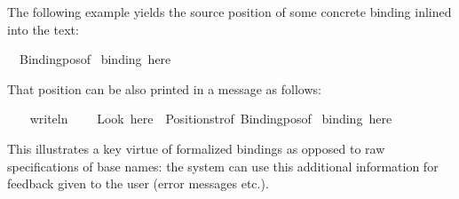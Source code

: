 \begin{isabellebody}
\begin{isamarkuptext}
\begin{description}
  \end{description}%
\end{isamarkuptext}%
\isamarkuptrue%
%
\endisatagmlantiq
{\isafoldmlantiq}%
%
\isadelimmlantiq
%
\endisadelimmlantiq
%
\isadelimmlex
%
\endisadelimmlex
%
\isatagmlex
%
\begin{isamarkuptext}%
The following example yields the source position of some
  concrete binding inlined into the text:%
\end{isamarkuptext}%
\isamarkuptrue%
%
\endisatagmlex
{\isafoldmlex}%
%
\isadelimmlex
%
\endisadelimmlex
%
\isadelimML
%
\endisadelimML
%
\isatagML
{}\isamarkupfalse%
\ {\isacharverbatimopen}\ Binding{\isachardot}pos{\isacharunderscore}of\ %
\isaantiq
binding\ here%
\endisaantiq
\ {\isacharverbatimclose}%
\endisatagML
{\isafoldML}%
%
\isadelimML
%
\endisadelimML
%
\begin{isamarkuptext}%
\medskip That position can be also printed in a message as
  follows:%
\end{isamarkuptext}%
\isamarkuptrue%
%
\isadelimML
%
\endisadelimML
%
\isatagML
{}\isamarkupfalse%
\ {\isacharverbatimopen}\isanewline
\ \ writeln\isanewline
\ \ \ \ {\isacharparenleft}{\isachardoublequote}Look\ here{\isachardoublequote}\ {\isacharcircum}\ Position{\isachardot}str{\isacharunderscore}of\ {\isacharparenleft}Binding{\isachardot}pos{\isacharunderscore}of\ %
\isaantiq
binding\ here%
\endisaantiq
{\isacharparenright}{\isacharparenright}\isanewline
{\isacharverbatimclose}%
\endisatagML
{\isafoldML}%
%
\isadelimML
%
\endisadelimML
%
\begin{isamarkuptext}%
This illustrates a key virtue of formalized bindings as
  opposed to raw specifications of base names: the system can use this
  additional information for feedback given to the user (error
  messages etc.).%
\end{isamarkuptext}%
\isamarkuptrue%
%
\isadelimtheory
%
\endisadelimtheory
%
\isatagtheory
{}\isamarkupfalse%
%
\endisatagtheory
{\isafoldtheory}%
%
\isadelimtheory
%
\endisadelimtheory
\isanewline
\end{isabellebody}%
